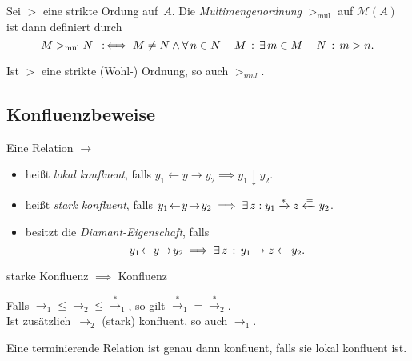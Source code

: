 \documentclass{cheat-sheet}
\newcommand{\from}{\leftarrow}
\newcommand{\reducesTo}{\xrightarrow{*}}
\newcommand{\fromOrEq}{\xleftarrow{=}}
\newcommand{\joinable}{\downarrow}
\newcommand{\Multisets}{\mathcal{M}} %
\begin{document}
\begin{defn}
  Sei ${>}$ eine strikte Ordung auf~$A$.
  Die \emph{Multimengenordnung} $>_{\text{mul}}$ auf $\Multisets(A)$ ist dann definiert durch
  \[
    M >_{\text{mul}} N \enspace:\!\iff M \neq N \wedge \forall \, {n \in N - M} \,:\, \exists \, {m \in M - N} \,:\, m > n.
  \]
\end{defn}

\begin{lem}
  Ist $>$ eine strikte (Wohl-) Ordnung, so auch $>_{\textit{mul}}$.
\end{lem}


\subsection{Konfluenzbeweise}

\begin{defn}
  Eine Relation ${\to}$
  \begin{itemize}
    \item heißt \emph{lokal konfluent}, falls $y_1 \!\from\! y \to y_2 \implies y_1 \joinable y_2$.
    \item heißt \emph{stark konfluent}, falls $y_1 \!\from\! y \!\to\! y_2 \implies \ex{z\!}\! y_1 \reducesTo z \fromOrEq y_2$.
    \item besitzt die \emph{Diamant-Eigenschaft}, falls
    \[
      y_1 \!\from\! y \!\to\! y_2 \implies \ex{z} y_1 \to z \from y_2.
    \]
  \end{itemize}
\end{defn}

\begin{lem}
  starke Konfluenz $\implies$ Konfluenz
\end{lem}

\begin{lem}
  \begin{minipage}[t]{0.8 \linewidth}
    Falls ${\to_1} \leq {\to_2} \leq {\xrightarrow{*}_1}$, so gilt ${\xrightarrow{*}_1} = {\xrightarrow{*}_2}$. \\
    Ist zusätzlich~$\to_2$ (stark) konfluent, so auch ${\to_1}$.
  \end{minipage}
\end{lem}

\begin{lem}
  Eine terminierende Relation ist genau dann konfluent, falls sie lokal konfluent ist.
\end{lem}
\end{document}
